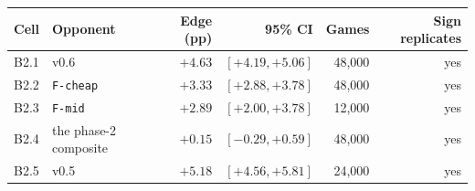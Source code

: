 \begin{tabular}{llrrrr}
\toprule
Cell & Opponent & Edge (pp) & 95\% CI & Games & Sign replicates \\
\midrule
B2.1 & v0.6 & $+4.63$ & $[+4.19, +5.06]$ & 48,000 & yes \\
B2.2 & \texttt{F-cheap} & $+3.33$ & $[+2.88, +3.78]$ & 48,000 & yes \\
B2.3 & \texttt{F-mid} & $+2.89$ & $[+2.00, +3.78]$ & 12,000 & yes \\
B2.4 & the phase-2 composite & $+0.15$ & $[-0.29, +0.59]$ & 48,000 & yes \\
B2.5 & v0.5 & $+5.18$ & $[+4.56, +5.81]$ & 24,000 & yes \\
\bottomrule
\end{tabular}
